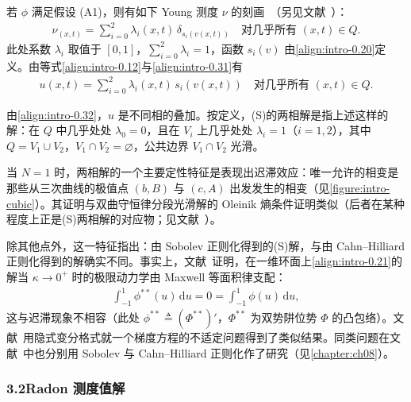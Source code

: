 \documentclass[../main.tex]{subfiles}
\begin{document}
若 $\phi$ 满足假设 (A1)，则有如下 Young 测度 $\nu$ 的刻画~\cite{ref83}（另见文献~\cite{ref82,ref84}）：
\begin{align}
\nu_{(x,t)} = \sum_{i=0}^2 \lambda_i(x,t)\,\delta_{s_i(v(x,t))}
\quad \text{对几乎所有 }(x,t)\in Q. \label{align:intro-0.31}
\end{align}
此处系数 $\lambda_i$ 取值于 $[0,1]$，$\sum_{i=0}^2\lambda_i=1$，函数 $s_i(v)$ 由\eqref{align:intro-0.20}定义。由等式\eqref{align:intro-0.12}与\eqref{align:intro-0.31}有
\begin{align}
u(x,t) = \sum_{i=0}^2\lambda_i(x,t)\,s_i(v(x,t))
\quad \text{对几乎所有 }(x,t)\in Q. \label{align:intro-0.32}
\end{align}

\begin{remark}\label{remark:intro-0.3.1}
由\eqref{align:intro-0.32}，$u$ 是不同相的叠加。按定义，(S)的两相解是指上述这样的解：在 $Q$ 中几乎处处 $\lambda_0=0$，且在 $V_i$ 上几乎处处 $\lambda_i=1$（$i=1,2$），其中 $Q=V_1\cup V_2$，$V_1\cap V_2=\varnothing$，公共边界 $V_1\cap V_2$ 光滑。

当 $N=1$ 时，两相解的一个主要定性特征是表现出迟滞效应：唯一允许的相变是那些从三次曲线的极值点 $(b,B)$ 与 $(c,A)$ 出发发生的相变（见\cref{figure:intro-cubic}）。其证明与双曲守恒律分段光滑解的 Oleinik 熵条件证明类似（后者在某种程度上正是(S)两相解的对应物；见文献~\cite{ref48,ref54,ref70,ref71,ref82,ref83,ref84,ref98}）。

除其他点外，这一特征指出：由 Sobolev 正则化得到的(S)解，与由 Cahn--Hilliard 正则化得到的解确实不同。事实上，文献~\cite{ref12}证明，在一维环面上\eqref{align:intro-0.21}的解当 $\kappa\to0^+$ 时的极限动力学由 Maxwell 等面积律支配：
\begin{align*}
\int_{-1}^1\phi^{**}(u)\,\mathrm{d}u = 0 = \int_{-1}^1\phi(u)\,\mathrm{d}u,
\end{align*}
这与迟滞现象不相容（此处 $\phi^{**}\triangleq (\Phi^{**})'$，$\Phi^{**}$ 为双势阱位势 $\Phi$ 的凸包络）。文献~\cite{ref43}用隐式变分格式就一个梯度方程的不适定问题得到了类似结果。同类问题在文献~\cite{ref30,ref95}中也分别用 Sobolev 与 Cahn--Hilliard 正则化作了研究（见\cref{chapter:ch08}）。
\end{remark}

\subsubsection*{3.2\quad Radon 测度值解}\label{subsubsection:intro-radonfb}
\end{document}
